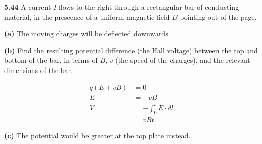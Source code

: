 \documentclass{article}
\begin{document}
\textbf{5.44}
A current $I$ flows to the right through a rectangular bar of conducting material, in the prescence of a uniform magnetic field $B$ pointing out of the page.

\textbf{(a)}
The moving charges will be deflected $\boxed{\text{downwards.}}$

\textbf{(b)}
Find the resulting potential difference (the Hall voltage) between the top and bottom of the bar, in terms of $B$, $v$ (the speed of the charges), and the relevant dimensions of the bar.

\begin{equation*}
\begin{split}
	q(E + v B) & = 0 \\
	E & = - v B \\
	V & = - \int_0^t E \cdot dl \\
	& = \boxed{v B t}
\end{split}
\end{equation*}

\textbf{(c)}
The potential would be greater at the top plate instead.
\end{document}
